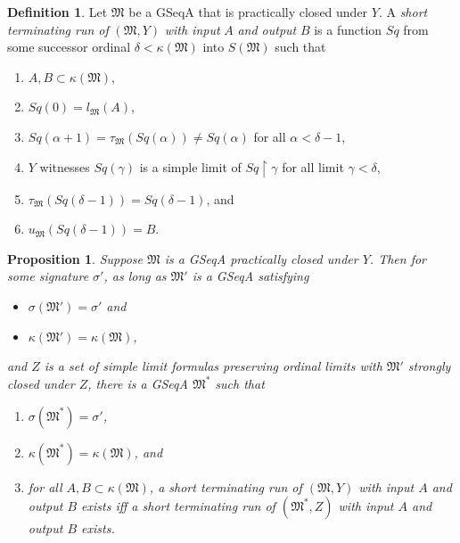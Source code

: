 \documentclass[12pt, twoside]{memoir}
\numberwithin{equation}{section}
\newtheorem{prop}[thm]{Proposition}
\theoremstyle{definition}
\newtheorem{defi}[thm]{Definition}
\theoremstyle{remark}
\theoremstyle{definition}
\theoremstyle{definition}
\theoremstyle{definition}
\theoremstyle{remark}
\begin{document}
\begin{defi}
Let $\mathfrak{M}$ be a GSeqA that is practically closed under $Y$. A \emph{short terminating run of} $(\mathfrak{M}, Y)$ \emph{with input} $A$ \emph{and output} $B$ is a function $Sq$ from some successor ordinal $\delta < \kappa(\mathfrak{M})$ into $S(\mathfrak{M})$ such that 
\begin{enumerate}[label=(\alph*)]
    \item $A, B \subset \kappa(\mathfrak{M})$,
    \item $Sq(0) = l_{\mathfrak{M}}(A)$,
    \item $Sq(\alpha + 1) = \tau_{\mathfrak{M}}(Sq(\alpha)) \neq Sq(\alpha)$ for all $\alpha < \delta - 1$,
    \item $Y$ witnesses $Sq(\gamma)$ is a simple limit of $Sq \restriction \gamma$ for all limit $\gamma < \delta$,
    \item $\tau_{\mathfrak{M}}(Sq(\delta - 1)) = Sq(\delta - 1)$, and
    \item $u_{\mathfrak{M}}(Sq(\delta - 1)) = B$.
\end{enumerate}
\end{defi}

\begin{prop}\label{prop239}
Suppose $\mathfrak{M}$ is a GSeqA practically closed under $Y$. Then for some signature $\sigma'$, as long as $\mathfrak{M}'$ is a GSeqA satisfying 
\begin{itemize}
    \item $\sigma(\mathfrak{M}') = \sigma'$ and
    \item $\kappa(\mathfrak{M}') = \kappa(\mathfrak{M})$,
\end{itemize}
and $Z$ is a set of simple limit formulas preserving ordinal limits with $\mathfrak{M}'$ strongly closed under $Z$, there is a GSeqA $\mathfrak{M}^*$ such that
\begin{enumerate}[label=(\alph*)]
    \item\label{2391} $\sigma(\mathfrak{M}^*) = \sigma'$,
    \item\label{2392} $\kappa(\mathfrak{M}^*) = \kappa(\mathfrak{M})$, and
    \item\label{2393} for all $A, B \subset \kappa(\mathfrak{M})$, a short terminating run of $(\mathfrak{M}, Y)$ with input $A$ and output $B$ exists iff a short terminating run of $(\mathfrak{M}^*, Z)$ with input $A$ and output $B$ exists.
\end{enumerate}
\end{prop}
\end{document}

